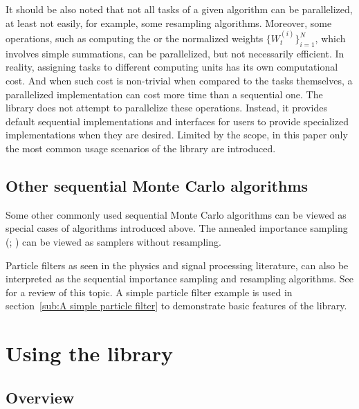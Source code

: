 \documentclass[11pt, fontset=Minion, showoverfull,
bib, mintcode, minted=cache]{marticle}
\begin{document}
It should be also noted that not all tasks of a given \smc algorithm can be
parallelized, at least not easily, for example, some resampling algorithms.
Moreover, some operations, such as computing the \ess or the normalized
weights $\{W_t^{(i)}\}_{i=1}^N$, which involves simple summations, can be
parallelized, but not necessarily efficient. In reality, assigning tasks to
different computing units has its own computational cost. And when such cost
is non-trivial when compared to the tasks themselves, a parallelized
implementation can cost more time than a sequential one. The \vsmc library
does not attempt to parallelize these operations. Instead, it provides default
sequential implementations and interfaces for users to provide specialized
implementations when they are desired. Limited by the scope, in this paper
only the most common usage scenarios of the library are introduced.

\subsection{Other sequential Monte Carlo algorithms}
\label{sub:Other sequential Monte Carlo algorithms}

Some other commonly used sequential Monte Carlo algorithms can be viewed as
special cases of algorithms introduced above. The annealed importance sampling
(\ais; \textcite{Neal:2001we}) can be viewed as \smc samplers without
resampling.

Particle filters as seen in the physics and signal processing literature, can
also be interpreted as the sequential importance sampling and resampling
algorithms. See \textcite{Doucet:2011us} for a review of this topic. A simple
particle filter example is used in section~\ref{sub:A simple particle filter}
to demonstrate basic features of the \vsmc library.

\section[Using the vSMC library]{Using the \protect\vsmc library}
\label{sec:Using the vSMC library}

\subsection{Overview}
\end{document}
